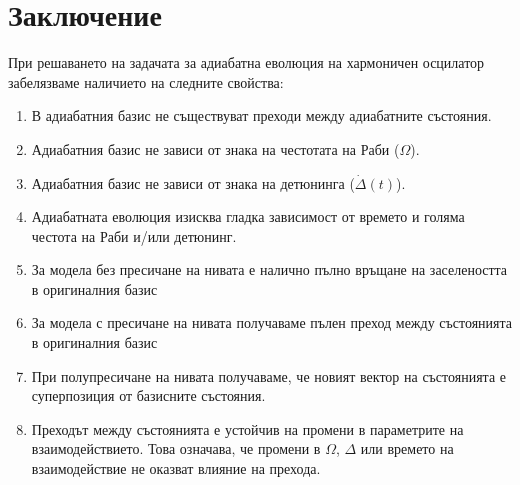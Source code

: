     \nocite{jones2012quantum}

    \section{Заключение}

    При решаването на задачата за адиабатна еволюция на хармоничен осцилатор забелязваме наличието на следните свойства:

    \begin{enumerate}
        \item В адиабатния базис не съществуват преходи между адиабатните състояния.
        \item Адиабатния базис не зависи от знака на честотата на Раби ($\Omega$).
        \item Адиабатния базис не зависи от знака на детюнинга ($\dot{\Delta}(t)$).
        \item Адиабатната еволюция изисква гладка зависимост от времето и голяма честота на Раби и/или детюнинг.
        \item За модела без пресичане на нивата е налично пълно връщане на заселеността в оригиналния базис
        \item За модела с пресичане на нивата получаваме пълен преход между състоянията в оригиналния базис
        \item При полупресичане на нивата получаваме, че новият вектор на състоянията е суперпозиция от базисните състояния.
        \item Преходът между състоянията е устойчив на промени в параметрите на взаимодействието. Това означава, че промени в $\Omega$,
        $\Delta$ или времето на взаимодействие не оказват влияние на прехода.
    \end{enumerate}